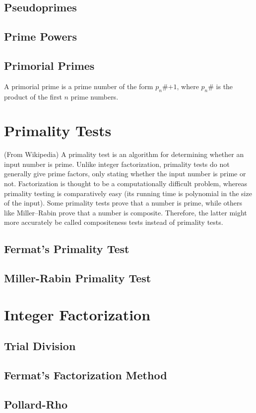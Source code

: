 \documentclass[12pt]{extarticle}
\begin{document}
\subsection*{Pseudoprimes}
\subsection*{Prime Powers}
\subsection*{Primorial Primes}
A primorial prime is a prime number of the form $p_{n}$\#$+1$, where $p_{n}$\# is the product of the first $n$ prime numbers. 
\section*{Primality Tests}
(From Wikipedia) A primality test is an algorithm for determining whether an input number is prime. Unlike integer factorization, primality tests do not generally give prime factors, only stating whether the input number is prime or not. Factorization is thought to be a computationally difficult problem, whereas primality testing is comparatively easy (its running time is polynomial in the size of the input). Some primality tests prove that a number is prime, while others like Miller–Rabin prove that a number is composite. Therefore, the latter might more accurately be called compositeness tests instead of primality tests.
\subsection*{Fermat's Primality Test}
\subsection*{Miller-Rabin Primality Test}
\section*{Integer Factorization}
\subsection*{Trial Division}
\subsection*{Fermat's Factorization Method}
\subsection*{Pollard-Rho}
\end{document}
